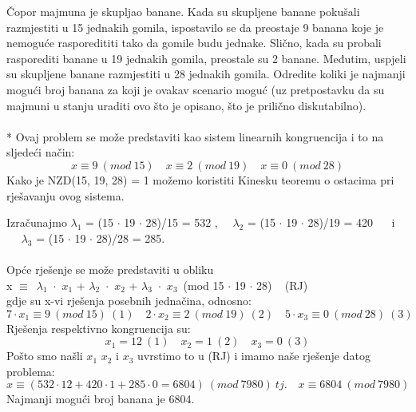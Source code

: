 \documentclass[12pt]{article}
\begin{document}
\begin{enumerate}
Čopor majmuna je skupljao banane. Kada su skupljene banane pokušali razmjestiti u 15
jednakih gomila, ispostavilo se da preostaje 9 banana koje je nemoguće rasporedititi tako da
gomile budu jednake. Slično, kada su probali rasporediti banane u 19 jednakih gomila,
preostale su 2 banane. Međutim, uspjeli su skupljene banane razmjestiti u 28 jednakih gomila.
Odredite koliki je najmanji mogući broj banana za koji je ovakav scenario moguć (uz
pretpostavku da su majmuni u stanju uraditi ovo što je opisano, što je prilično diskutabilno).
\\
\\ 
* Ovaj problem se može predstaviti kao sistem linearnih kongruencija i to na sljedeći način: 
\begin{equation*}
x \equiv 9 ~(mod~15) \quad 
x \equiv 2 ~(mod~19) \quad 
x \equiv 0 ~(mod~28)
\end{equation*}
Kako je NZD(15, 19, 28) = 1 možemo koristiti Kinesku teoremu o ostacima pri
rješavanju ovog sistema.

\newpage

Izračunajmo ${\lambda_{1}}$ = (15 ${\cdot}$ 19 ${\cdot}$ 28)/15 = 532 ,~~ $\lambda_{2}$ =
(15 ${\cdot}$ 19 ${\cdot}$ 28)/19 = 420 ~~ i \\
~~ ${\lambda_{3}}$ = (15 ${\cdot}$ 19 ${\cdot}$ 28)/28 = 285. \\
\\ 
Opće rješenje se može predstaviti u obliku \\
x ${\equiv}$~$\lambda_{1}$~${\cdot}$~$x_{1}$  + $\lambda_{2}$~${\cdot}$~$x_{2}$  + $\lambda_{3}$~${\cdot}$~$x_{3}$~(mod 15 ${\cdot}$ 19 ${\cdot}$ 28) ~ (RJ) \\
gdje su x-vi rješenja posebnih jednačina, odnosno: \\
\begin{equation*}
7 \cdot x_1 \equiv 9 ~(mod~15) ~ (1) \quad 
2 \cdot x_2 \equiv 2 ~(mod~19) ~ (2) \quad 
5 \cdot x_3  \equiv 0 ~(mod~28) ~ (3)
\end{equation*}
Rješenja respektivno kongruencija su: 
\begin{equation*}
x_1 = 12 ~ (1) \quad 
x_2 = 1 ~ (2) \quad 
x_3 = 0 ~ (3)  
\end{equation*}
Pošto smo našli $x_1$ $x_2$ i $x_3$ uvrstimo to u (RJ) i imamo naše rješenje datog problema: 
\begin{equation*}
x \equiv (532 \cdot 12 + 420 \cdot 1 + 285 \cdot 0 = 6804)~(mod~7980)~ tj. \quad x \equiv 6804~(mod~ 7980) 
\end{equation*}
Najmanji mogući broj banana je 6804.


\end{enumerate}
\end{document}
